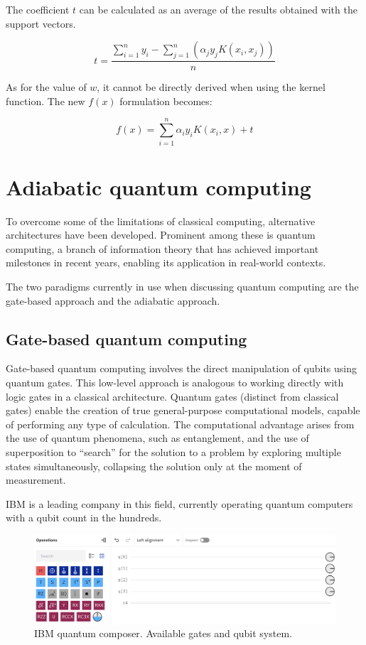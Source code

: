 The coefficient $t$ can be calculated as an average of the results obtained with the support vectors.

$$t = \frac{\sum_{i=1}^n y_i - \sum_{j=1}^n(\alpha_jy_jK(x_i,x_j))}{n}$$

As for the value of $w$, it cannot be directly derived when using the kernel function. The new $f(x)$ formulation becomes:

\begin{equation}
  f(x)=\sum_{i=1}^n\alpha_iy_iK(x_i, x) + t\label{eq:svm-predict}
\end{equation}

\section{Adiabatic quantum computing}

To overcome some of the limitations of classical computing, alternative architectures have been developed. Prominent among these is quantum computing, a branch of information theory that has achieved important milestones in recent years, enabling its application in real-world contexts.

The two paradigms currently in use when discussing quantum computing are the gate-based approach and the adiabatic approach.

\subsection{Gate-based quantum computing}

Gate-based quantum computing involves the direct manipulation of qubits using quantum gates\cite{QGate}. This low-level approach is analogous to working directly with logic gates in a classical architecture. Quantum gates (distinct from classical gates) enable the creation of true general-purpose computational models, capable of performing any type of calculation. The computational advantage arises from the use of quantum phenomena, such as entanglement, and the use of superposition to ``search'' for the solution to a problem by exploring multiple states simultaneously, collapsing the solution only at the moment of measurement.

IBM is a leading company in this field, currently operating quantum computers with a qubit count in the hundreds.

\begin{figure}[H]
  \centering
  \includegraphics[width=\textwidth]{figures/4qubit}
  \caption{IBM quantum composer. Available gates and qubit system.}
\end{figure}

